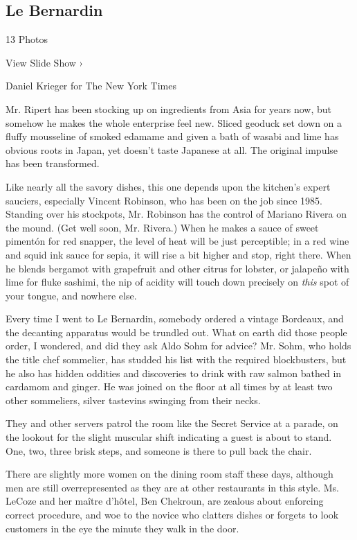 \href{https://www.nytimes3xbfgragh.onion/slideshow/2012/05/23/dining/20120523-REST.html}{}

\hypertarget{le-bernardin}{%
\subsection{Le Bernardin}\label{le-bernardin}}

13 Photos

View Slide Show ›

Daniel Krieger for The New York Times

Mr. Ripert has been stocking up on ingredients from Asia for years now,
but somehow he makes the whole enterprise feel new. Sliced geoduck set
down on a fluffy mousseline of smoked edamame and given a bath of wasabi
and lime has obvious roots in Japan, yet doesn't taste Japanese at all.
The original impulse has been transformed.

Like nearly all the savory dishes, this one depends upon the kitchen's
expert sauciers, especially Vincent Robinson, who has been on the job
since 1985. Standing over his stockpots, Mr. Robinson has the control of
Mariano Rivera on the mound. (Get well soon, Mr. Rivera.) When he makes
a sauce of sweet pimentón for red snapper, the level of heat will be
just perceptible; in a red wine and squid ink sauce for sepia, it will
rise a bit higher and stop, right there. When he blends bergamot with
grapefruit and other citrus for lobster, or jalapeño with lime for fluke
sashimi, the nip of acidity will touch down precisely on \emph{this}
spot of your tongue, and nowhere else.

Every time I went to Le Bernardin, somebody ordered a vintage Bordeaux,
and the decanting apparatus would be trundled out. What on earth did
those people order, I wondered, and did they ask Aldo Sohm for advice?
Mr. Sohm, who holds the title chef sommelier, has studded his list with
the required blockbusters, but he also has hidden oddities and
discoveries to drink with raw salmon bathed in cardamom and ginger. He
was joined on the floor at all times by at least two other sommeliers,
silver tastevins swinging from their necks.

They and other servers patrol the room like the Secret Service at a
parade, on the lookout for the slight muscular shift indicating a guest
is about to stand. One, two, three brisk steps, and someone is there to
pull back the chair.

There are slightly more women on the dining room staff these days,
although men are still overrepresented as they are at other restaurants
in this style. Ms. LeCoze and her maître d'hôtel, Ben Chekroun, are
zealous about enforcing correct procedure, and woe to the novice who
clatters dishes or forgets to look customers in the eye the minute they
walk in the door.

